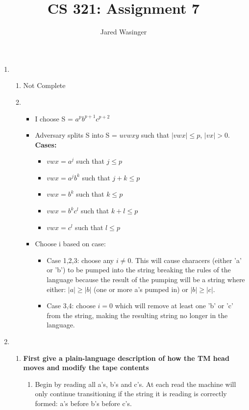 \documentclass{article}
\begin{document}
  \title{CS 321: Assignment 7}
  \author{Jared Wasinger}

  \maketitle

	\begin{enumerate}
		\item\begin{enumerate}
			\item Not Complete
			\item\begin{itemize}
				\item I choose S = $a^pb^{p+1}c^{p+2}$
				\item Adversary splits S into S = $uvwxy$ such that $|vwx| \leq p$, $|vx| > 0$.  \textbf{Cases:} \begin{itemize}
					\item $vwx = a^j$ such that $j \leq p$
					\item $vwx = a^jb^k$ such that $j+k \leq p$
					\item $vwx = b^k$ such that $k \leq p$
					\item $vwx = b^kc^l$ such that $k+l \leq p$
					\item $vwx = c^l$ such that $l \leq p$
					\end{itemize}
				\item Choose i based on case:\begin{itemize}
					\item Case 1,2,3: choose any $i \neq 0$.  This will cause characers (either 'a' or 'b') to be pumped into the string breaking the rules of the language because the result of the pumping will be a string where either: $|a| \geq |b|$ (one or more a's pumped in) or $|b| \geq |c|$.
					\item Case 3,4:  choose $i = 0$ which will remove at least one 'b' or 'c' from the string, making the resulting string no longer in the language.
					\end{itemize}
				\end{itemize}
			\end{enumerate}
		\item\begin{enumerate}
			\item \textbf{First give a plain-language description of how the TM head moves and modify the tape contents}
				\begin{enumerate}
					\item Begin by reading all a's, b's and c's.  At each read the machine will only continue transitioning if the string it is reading is correctly formed: a's before b's before c's.

\end{enumerate}
\end{enumerate}
\end{enumerate}
\end{document}
